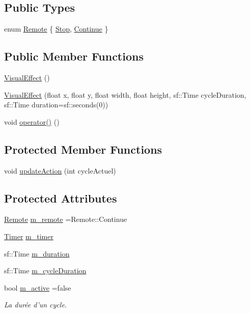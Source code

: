 \subsection*{Public Types}
\begin{DoxyCompactItemize}
\item 
enum \hyperlink{class_visual_effect_a424c945f200061a6818471361620078d}{Remote} \{ \hyperlink{class_visual_effect_a424c945f200061a6818471361620078dad1f70d60d969d21d94155120b9afcd91}{Stop}, 
\hyperlink{class_visual_effect_a424c945f200061a6818471361620078da3180538978112bf1a50060a7ebf9c16c}{Continue}
 \}
\end{DoxyCompactItemize}
\subsection*{Public Member Functions}
\begin{DoxyCompactItemize}
\item 
\hyperlink{class_visual_effect_a521efaa2152011dc90cecb1b0b2232da}{Visual\-Effect} ()
\item 
\hyperlink{class_visual_effect_a3c6c57d83f67512337c67fe5a7dcaf4c}{Visual\-Effect} (float x, float y, float width, float height, sf\-::\-Time cycle\-Duration, sf\-::\-Time duration=sf\-::seconds(0))
\item 
void \hyperlink{class_visual_effect_a8444177403c955aa02d6e82e55e34297}{operator()} ()
\end{DoxyCompactItemize}
\subsection*{Protected Member Functions}
\begin{DoxyCompactItemize}
\item 
void \hyperlink{class_visual_effect_adcc6e6f9398d40e7cb9cae9edfcaace5}{update\-Action} (int cycle\-Actuel)
\end{DoxyCompactItemize}
\subsection*{Protected Attributes}
\begin{DoxyCompactItemize}
\item 
\hyperlink{class_visual_effect_a424c945f200061a6818471361620078d}{Remote} \hyperlink{class_visual_effect_a345e31dcd679c46231bb028f4eb716fd}{m\-\_\-remote} =Remote\-::\-Continue
\item 
\hyperlink{class_timer}{Timer} \hyperlink{class_visual_effect_a810d29aed760dcfe3b1bd6e0fd85243a}{m\-\_\-timer}
\item 
sf\-::\-Time \hyperlink{class_visual_effect_abb44ecb249d5fca2af1ecd72c5a20e49}{m\-\_\-duration}
\item 
sf\-::\-Time \hyperlink{class_visual_effect_a9b414b1c6acfebad5d33a6b767c45ff7}{m\-\_\-cycle\-Duration}
\item 
bool \hyperlink{class_visual_effect_a46968c3c2f3ef411b19ea03edcb96f92}{m\-\_\-active} =false
\begin{DoxyCompactList}\small\item\em La durée d'un cycle. \end{DoxyCompactList}\end{DoxyCompactItemize}


